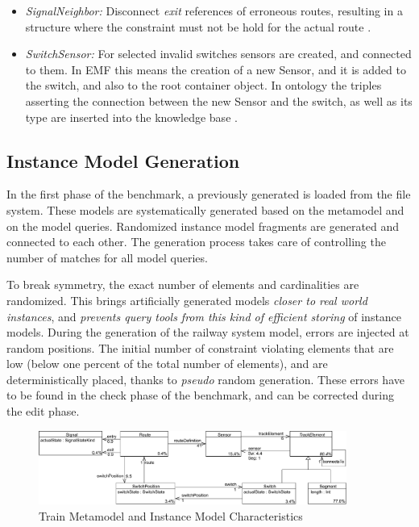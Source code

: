 \begin{itemize}
\begin{itemize}
    \item  \emph{SignalNeighbor:} Disconnect \emph{exit} references of erroneous routes, resulting in a structure where the constraint must not be hold for the actual route .
    
    \item \emph{SwitchSensor:} For selected invalid switches sensors are created, and connected to them.
    In EMF this means the creation of a new Sensor, and it is added to the switch, and also to the root container object. In ontology the triples asserting the connection between the new Sensor and the switch, as well as its type are inserted into the knowledge base .  
    
  \end{itemize}
\end{itemize}
 


\subsection{Instance Model Generation}
\label{sec:instanceGeneration}

In the first phase of the benchmark, a previously generated  is loaded from the file system. These models are systematically generated based on the metamodel and on the model queries. Randomized instance model fragments are generated and connected to each other. The generation process takes care of controlling the number of matches for all model queries.

To break symmetry, the exact number of elements and cardinalities are randomized. This brings artificially generated models \emph{closer to real world instances}, and \emph{prevents query tools from this kind of efficient storing} of instance models. During the generation of the railway system model, errors are injected at random positions. The initial number of constraint violating elements that are low (below one percent of the total number of elements), and are deterministically placed, thanks to \emph{pseudo} random generation. These errors have to be found in the check phase of the benchmark, and can be corrected during the edit phase.

\begin{figure}[Htb]
\begin{center}
\includegraphics[width=0.9\textwidth]{figures/instance/TrainMMb.pdf}
\caption{Train Metamodel and Instance Model Characteristics}
\label{fig:metamodel-instance-characteristics}
\end{center}
\end{figure}

